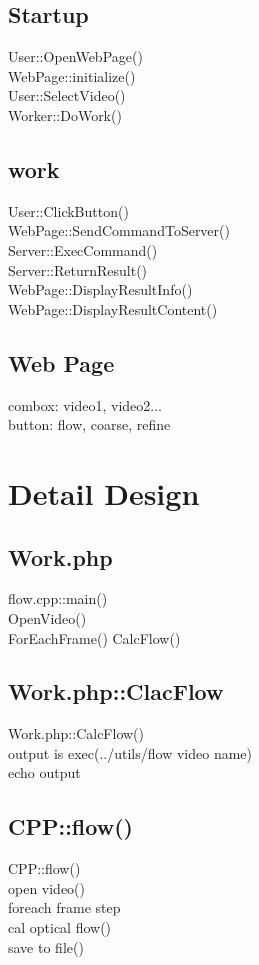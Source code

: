 \documentclass{article}
\begin{document}
\subsection{Startup}

User::OpenWebPage()\\
\indent WebPage::initialize()\\
\indent User::SelectVideo()\\
\indent Worker::DoWork()

\subsection{work}
User::ClickButton()\\
\indent WebPage::SendCommandToServer()\\
\indent Server::ExecCommand()\\
\indent Server::ReturnResult()\\
\indent \indent WebPage::DisplayResultInfo()\\
\indent \indent WebPage::DisplayResultContent()

\subsection{Web Page}

combox: video1, video2...\\
button: flow, coarse, refine

\section{Detail Design}

\subsection{Work.php}
flow.cpp::main()\\
\indent OpenVideo()\\
\indent ForEachFrame()
\indent CalcFlow()

\subsection{Work.php::ClacFlow}
Work.php::CalcFlow()\\
\indent output is exec(../utils/flow video name)\\
\indent echo output


\subsection{CPP::flow()}
CPP::flow()\\
\indent open video()\\
\indent foreach frame step\\
\indent \indent cal optical flow()\\
\indent \indent save to file()


\iffalse
\fi
\end{document}
